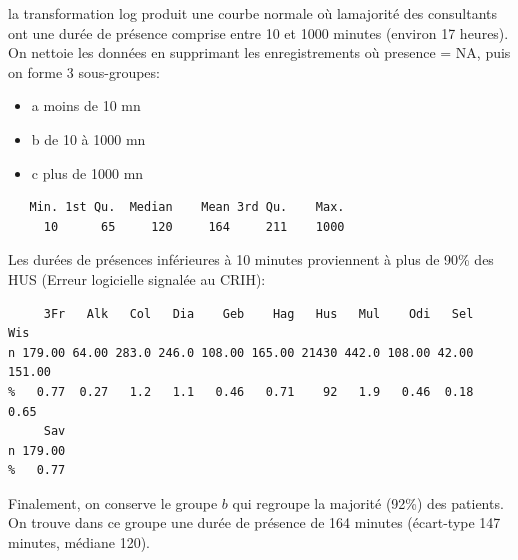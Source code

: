 \documentclass[12pt,english,french,twoside]{book}\usepackage[]{graphicx}\usepackage[]{color}
\makeatletter
\newenvironment{kframe}{%
 \def\at@end@of@kframe{}%
 \ifinner\ifhmode%
  \def\at@end@of@kframe{\end{minipage}}%
  \begin{minipage}{\columnwidth}%
 \fi\fi%
 \def\FrameCommand##1{\hskip\@totalleftmargin \hskip-\fboxsep
 \colorbox{shadecolor}{##1}\hskip-\fboxsep
     \hskip-\linewidth \hskip-\@totalleftmargin \hskip\columnwidth}%
 \MakeFramed {\advance\hsize-\width
   \@totalleftmargin\z@ \linewidth\hsize
   \@setminipage}}%
 {\par\unskip\endMakeFramed%
 \at@end@of@kframe}
\newenvironment{knitrout}{}{} %
\makeatother
\begin{document}
la transformation log produit une courbe normale où lamajorité des consultants ont une durée de présence comprise entre 10 et 1000 minutes (environ 17 heures). On nettoie les données en supprimant les enregistrements où presence = NA, puis on forme 3 sous-groupes:
\begin{itemize}
  \item a moins de 10 mn
  \item b de 10 à 1000 mn
  \item c plus de 1000 mn
\end{itemize}

\begin{knitrout}
\color{fgcolor}\begin{kframe}
\begin{verbatim}
   Min. 1st Qu.  Median    Mean 3rd Qu.    Max. 
     10      65     120     164     211    1000 
\end{verbatim}
\end{kframe}
\end{knitrout}


Les durées de présences inférieures à 10 minutes proviennent à plus de 90\% des HUS (Erreur logicielle signalée au CRIH):
\begin{knitrout}
\color{fgcolor}\begin{kframe}
\begin{verbatim}
     3Fr   Alk   Col   Dia    Geb    Hag   Hus   Mul    Odi   Sel    Wis
n 179.00 64.00 283.0 246.0 108.00 165.00 21430 442.0 108.00 42.00 151.00
%   0.77  0.27   1.2   1.1   0.46   0.71    92   1.9   0.46  0.18   0.65
     Sav
n 179.00
%   0.77
\end{verbatim}
\end{kframe}
\end{knitrout}


Finalement, on conserve le groupe $b$ qui regroupe la majorité (92\%) des patients. On trouve dans ce groupe une durée de présence de 164 minutes (écart-type 147 minutes, médiane 120).
\end{document}
